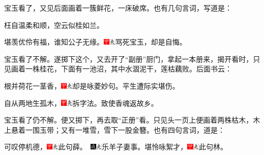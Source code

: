 宝玉看了，又见后面画着一簇鲜花，一床破席。也有几句言词，写道是：

枉自温柔和顺，空云似桂如兰。

堪羡优伶有福，谁知公子无缘。{\includegraphics[width=3mm]{../Images/00002}\includegraphics[width=3mm]{../Images/00012}\footnotesize \kaishu 骂死宝玉，却是自悔。}

宝玉看了不解。遂掷下这个，又去开了``副册''厨门，拿起一本册来，揭开看时，只见画着一株桂花，下面有一池沼，其中水涸泥干，莲枯藕败。后面书云：

根并荷花一茎香，{\includegraphics[width=3mm]{../Images/00002}\includegraphics[width=3mm]{../Images/00012}\footnotesize \kaishu 却是咏菱妙句。}平生遭际实堪伤。

自从两地生孤木，{\includegraphics[width=3mm]{../Images/00002}\includegraphics[width=3mm]{../Images/00012}\footnotesize \kaishu 拆字法。}致使香魂返故乡。

宝玉看了仍不解。便又掷下，再去取``正册''看。只见头一页上便画着两株枯木，木上悬着一围玉带；又有一堆雪，雪下一股金簪。也有四句言词，道是：

可叹停机德，{{\includegraphics[width=3mm]{../Images/00002}\includegraphics[width=3mm]{../Images/00012}\footnotesize \kaishu 此句薛。　}\includegraphics[width=3mm]{../Images/00005}\includegraphics[width=3mm]{../Images/00012}\footnotesize \kaishu 乐羊子妻事。}堪怜咏絮才，{\includegraphics[width=3mm]{../Images/00002}\includegraphics[width=3mm]{../Images/00012}\footnotesize \kaishu 此句林。}

